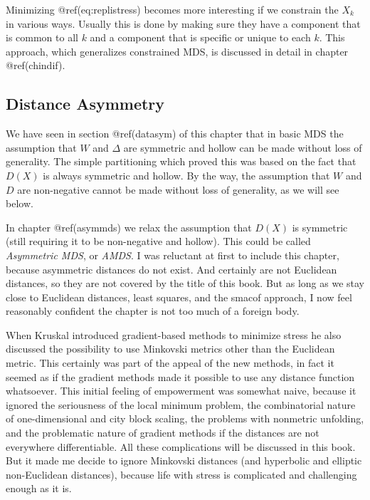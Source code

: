 \documentclass[
  12pt,
  letterpaper,
  DIV=11,
  numbers=noendperiod]{scrreprt}
\theoremstyle{remark}
\begin{document}
Minimizing @ref(eq:replistress) becomes more interesting if we constrain
the \(X_k\) in various ways. Usually this is done by making sure they
have a component that is common to all \(k\) and a component that is
specific or unique to each \(k\). This approach, which generalizes
constrained MDS, is discussed in detail in chapter @ref(chindif).

\subsection{Distance Asymmetry}\label{genasym}

We have seen in section @ref(datasym) of this chapter that in basic MDS
the assumption that \(W\) and \(\Delta\) are symmetric and hollow can be
made without loss of generality. The simple partitioning which proved
this was based on the fact that \(D(X)\) is always symmetric and hollow.
By the way, the assumption that \(W\) and \(D\) are non-negative cannot
be made without loss of generality, as we will see below.

In chapter @ref(asymmds) we relax the assumption that \(D(X)\) is
symmetric (still requiring it to be non-negative and hollow). This could
be called \emph{Asymmetric MDS}, or \emph{AMDS}. I was reluctant at
first to include this chapter, because asymmetric distances do not
exist. And certainly are not Euclidean distances, so they are not
covered by the title of this book. But as long as we stay close to
Euclidean distances, least squares, and the smacof approach, I now feel
reasonably confident the chapter is not too much of a foreign body.

When Kruskal introduced gradient-based methods to minimize stress he
also discussed the possibility to use Minkovski metrics other than the
Euclidean metric. This certainly was part of the appeal of the new
methods, in fact it seemed as if the gradient methods made it possible
to use any distance function whatsoever. This initial feeling of
empowerment was somewhat naive, because it ignored the seriousness of
the local minimum problem, the combinatorial nature of one-dimensional
and city block scaling, the problems with nonmetric unfolding, and the
problematic nature of gradient methods if the distances are not
everywhere differentiable. All these complications will be discussed in
this book. But it made me decide to ignore Minkovski distances (and
hyperbolic and elliptic non-Euclidean distances), because life with
stress is complicated and challenging enough as it is.
\end{document}
